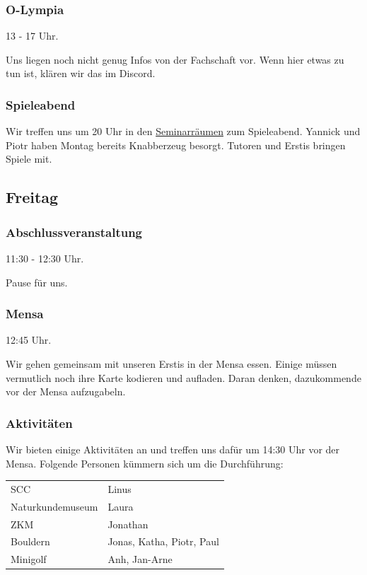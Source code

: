 \documentclass[10pt,ngerman]{scrartcl}
\begin{document}
\begin{multicols}{2}
\subsubsection{O-Lympia}

13 - 17 Uhr.

Uns liegen noch nicht genug Infos von der Fachschaft vor.
Wenn hier etwas zu tun ist, klären wir das im Discord.

\subsubsection{Spieleabend}

Wir treffen uns um 20 Uhr in den \hyperref[rooms]{Seminarräumen} zum Spieleabend.
Yannick und Piotr haben Montag bereits Knabberzeug besorgt.
Tutoren und Erstis bringen Spiele mit.



\subsection{Freitag}

\subsubsection{Abschlussveranstaltung}

11:30 - 12:30 Uhr.

Pause für uns.

\subsubsection{Mensa}

12:45 Uhr.

Wir gehen gemeinsam mit unseren Erstis in der Mensa essen.
Einige müssen vermutlich noch ihre Karte kodieren und aufladen.
Daran denken, dazukommende vor der Mensa aufzugabeln.

\subsubsection{Aktivitäten}

Wir bieten einige Aktivitäten an und treffen uns dafür um 14:30 Uhr vor der Mensa.
Folgende Personen kümmern sich um die Durchführung:

\begin{tabular}[H]{ll}
    SCC & Linus \\
    Naturkundemuseum & Laura \\
    ZKM & Jonathan \\
    Bouldern & Jonas, Katha, Piotr, Paul \\
    Minigolf & Anh, Jan-Arne \\
\end{tabular}


\end{multicols}
\end{document}
